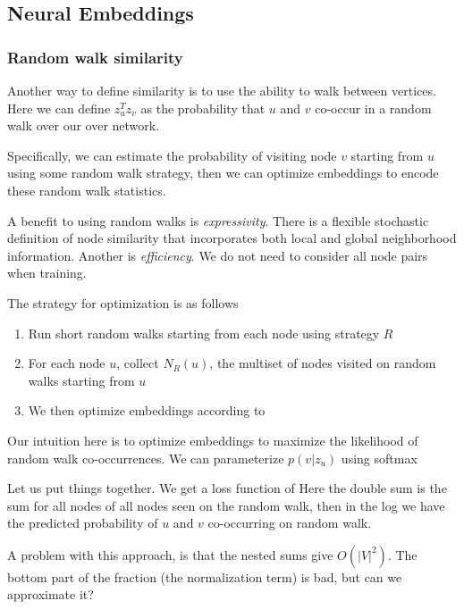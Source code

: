 \subsection{Neural Embeddings}
    \subsubsection{Random walk similarity}
    Another way to define similarity is to use the ability to walk between vertices. Here we can define $z_u^T z_v$ as the probability that $u$ and $v$ co-occur in a random walk over our over network. 
    
    Specifically, we can estimate the probability of visiting node $v$ starting from $u$ using some random walk strategy, then we can optimize embeddings to encode these random walk statistics. 
    
    A benefit to using random walks is \emph{expressivity}. There is a flexible stochastic definition of node similarity that incorporates both local and global neighborhood information. Another is \emph{efficiency}. We do not need to consider all node pairs when training. 
    
    The strategy for optimization is as follows
    \begin{enumerate}
        \item Run short random walks starting from each node using strategy $R$
        \item For each node $u$, collect $N_R(u)$, the multiset of nodes visited on random walks starting from $u$
        \item We then optimize embeddings according to 
    \end{enumerate}
    
    Our intuition here is to optimize embeddings to maximize the likelihood of random walk co-occurrences. We can parameterize $p(v | z_u)$ using softmax 

    Let us put things together. We get a loss function of 
    Here the double sum is the sum for all nodes of all nodes seen on the random walk, then in the log we have the predicted probability of $u$ and $v$ co-occurring on random walk. 

    A problem with this approach, is that the nested sums give $O(|V|^2)$. The bottom part of the fraction (the normalization term) is bad, but can we approximate it? 
    
